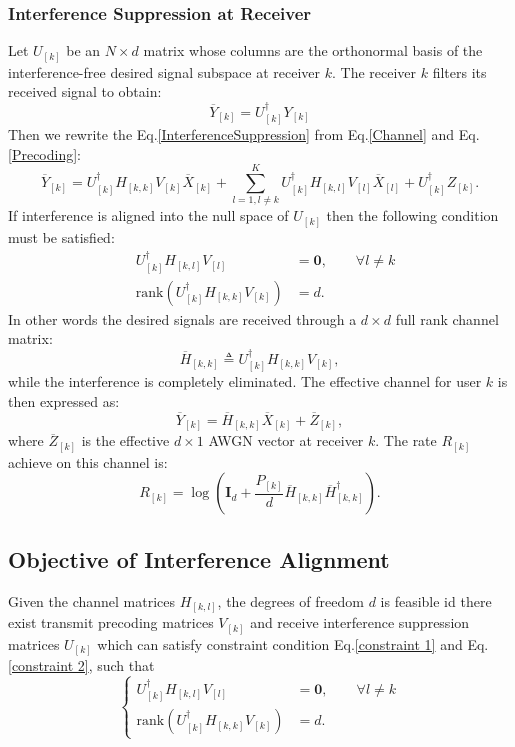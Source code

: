 \documentclass[12pt, onecolumn]{IEEEtran}
\begin{document}
\subsubsection{Interference Suppression at Receiver}
Let $U_{[k]}$ be an $N\times{}d$ matrix whose columns are the orthonormal basis of the interference-free desired signal subspace at receiver $k$. The receiver $k$ filters its  received signal to obtain:
\begin{equation}\label{InterferenceSuppression}
\overline{Y}_{[k]} = U_{[k]}^{\dag}Y_{[k]}
\end{equation}
Then we rewrite the Eq.\eqref{InterferenceSuppression} from Eq.\eqref{Channel} and Eq.\eqref{Precoding}:
\begin{equation}
    \overline{Y}_{[k]} = U_{[k]}^{\dag}H_{[k,k]}V_{[k]}\overline{X}_{[k]} + \sum_{l=1,l\neq{}k}^{K}U_{[k]}^{\dag}H_{[k,l]}V_{[l]}\overline{X}_{[l]} + U_{[k]}^{\dag}Z_{[k]}.
\end{equation}
If  interference is aligned into the null space of $U_{[k]}$ then the following condition must be satisfied:
\begin{eqnarray}
    & U_{[k]}^{\dag}H_{[k,l]}V_{[l]} &= \textbf{0}, \qquad{} \forall l\neq{}k \label{constraint 1} \\
    & \text{rank}(U_{[k]}^{\dag}H_{[k,k]}V_{[k]}) &= d. \label{constraint 2}
\end{eqnarray}
In other words the desired signals are received through a $d\times{}d$ full rank channel matrix:
\begin{equation}
\overline{H}_{[k,k]} \triangleq U_{[k]}^{\dag}H_{[k,k]}V_{[k]},
\end{equation}
while the interference is completely eliminated. The effective channel for user $k$ is then expressed as:
\begin{equation}
\overline{Y}_{[k]}=\overline{H}_{[k,k]} \overline{X}_{[k]}+\overline{Z}_{[k]},
\end{equation}
where $\overline{Z}_{[k]}$ is the effective $d\times{}1$ AWGN vector at receiver $k$. The rate $R_{[k]}$ achieve on this channel is:
\begin{equation}
R_{[k]} = \log(\textbf{I}_{d} + \frac{P_{[k]}}{d}\overline{H}_{[k,k]}\overline{H}_{[k,k]}^{\dag}).
\end{equation}


\subsection{Objective of Interference Alignment}
Given the channel matrices $H_{[k,l]}$, the degrees of freedom $d$ is feasible id there exist transmit precoding matrices $V_{[k]}$ and receive interference suppression matrices $U_{[k]}$ which can satisfy constraint  condition Eq.\eqref{constraint 1} and Eq.\eqref{constraint 2}, such that
\begin{equation}
   \left\{
        \begin{aligned}
                 U_{[k]}^{\dag}H_{[k,l]}V_{[l]} &= \textbf{0}, \qquad{} \forall l\neq{}k  \\
                 \text{rank}(U_{[k]}^{\dag}H_{[k,k]}V_{[k]}) &= d.
        \end{aligned}
   \right.
\end{equation}
\end{document}

